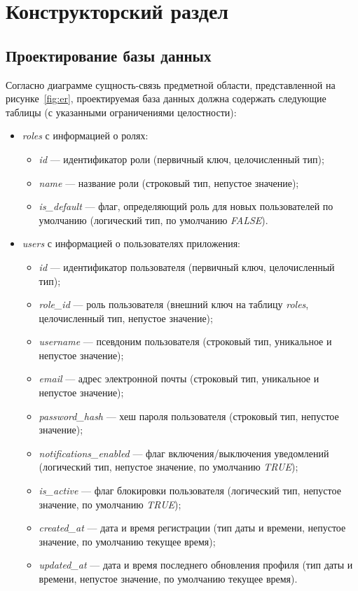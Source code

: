 \chapter{Конструкторский раздел}


\section{Проектирование базы данных}

Согласно диаграмме сущность-связь предметной области, представленной на рисунке~\ref{fig:er}, проектируемая база данных должна содержать следующие таблицы (с указанными ограничениями целостности):

\begin{itemize}
    \item \textit{roles} с информацией о ролях:
    \begin{itemize}
        \item \textit{id} --- идентификатор роли (первичный ключ, целочисленный тип);
        \item \textit{name} --- название роли (строковый тип, непустое значение);
        \item \textit{is\_default} --- флаг, определяющий роль для новых пользователей по умолчанию (логический тип, по умолчанию \textit{FALSE}).
    \end{itemize}

    \item \textit{users} с информацией о пользователях приложения:
    \begin{itemize}
        \item \textit{id} --- идентификатор пользователя (первичный ключ, целочисленный тип);
        \item \textit{role\_id} --- роль пользователя (внешний ключ на таблицу \textit{roles}, целочисленный тип, непустое значение);
        \item \textit{username} --- псевдоним пользователя (строковый тип, уникальное и непустое значение);
        \item \textit{email} --- адрес электронной почты (строковый тип, уникальное и непустое значение);
        \item \textit{password\_hash} --- хеш пароля пользователя (строковый тип, непустое значение);
        \item \textit{notifications\_enabled} --- флаг включения/выключения уведомлений (логический тип, непустое значение, по умолчанию \textit{TRUE});
        \item \textit{is\_active} --- флаг блокировки пользователя (логический тип, непустое значение, по умолчанию \textit{TRUE});
        \item \textit{created\_at} --- дата и время регистрации (тип даты и времени, непустое значение, по умолчанию текущее время);
        \item \textit{updated\_at} --- дата и время последнего обновления профиля (тип даты и времени, непустое значение, по умолчанию текущее время).
    \end{itemize}


\end{itemize}
